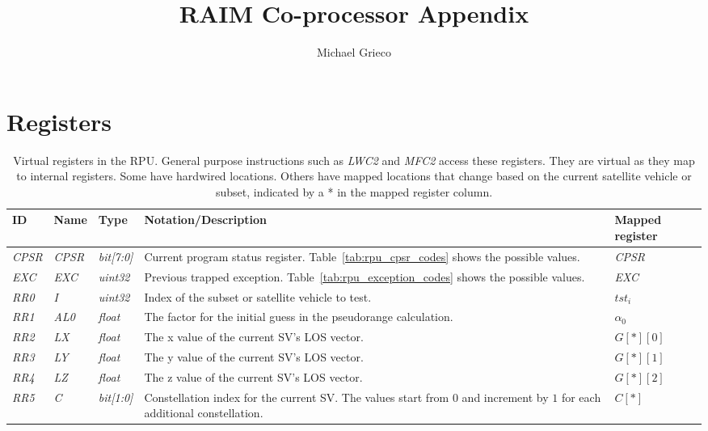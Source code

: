 \documentclass[11pt]{article}
\title{RAIM Co-processor Appendix}
\author{Michael Grieco}
\date{}
\begin{document}
\section{Registers}

\begin{table}[htbp] \begin{center}
  \caption{Virtual registers in the RPU. General purpose instructions such as \emph{LWC2} and \emph{MFC2} access these registers. They are virtual as they map to internal registers. Some have hardwired locations. Others have mapped locations that change based on the current satellite vehicle or subset, indicated by a * in the mapped register column.}
  \label{tab:rpu_virtual_registers}
  \begin{tabular}{|m{1.25cm}|m{1.5cm}|m{1.75cm}|m{5.25cm}|m{1.5cm}|}
    \hline
    \textbf{ID} & \textbf{Name} & \textbf{Type} & \textbf{Notation/Description} & \textbf{Mapped register}\\ \hline

    \emph{CPSR} & \emph{CPSR} & \emph{bit[7:0]} & Current program status register. Table~\ref{tab:rpu_cpsr_codes} shows the possible values. & \emph{CPSR}\\ \hline

    \emph{EXC} & \emph{EXC} & \emph{uint32} & Previous trapped exception. Table~\ref{tab:rpu_exception_codes} shows the possible values. & \emph{EXC}\\ \hline

    \emph{RR0} & \emph{I} & \emph{uint32} & Index of the subset or satellite vehicle to test. & $tst_i$\\ \hline

    \emph{RR1} & \emph{AL0} & \emph{float} & The factor for the initial guess in the pseudorange calculation. & $\alpha_0$\\ \hline

    \emph{RR2} & \emph{LX} & \emph{float} & The x value of the current SV's LOS vector. & $G[*][0]$\\ \hline
    \emph{RR3} & \emph{LY} & \emph{float} & The y value of the current SV's LOS vector. & $G[*][1]$\\ \hline
    \emph{RR4} & \emph{LZ} & \emph{float} & The z value of the current SV's LOS vector. & $G[*][2]$\\ \hline

    \emph{RR5} & \emph{C} & \emph{bit[1:0]} & Constellation index for the current SV. The values start from $0$ and increment by $1$ for each additional constellation. & $C[*]$\\ \hline


\end{tabular}
\end{center}
\end{table}
\end{document}
